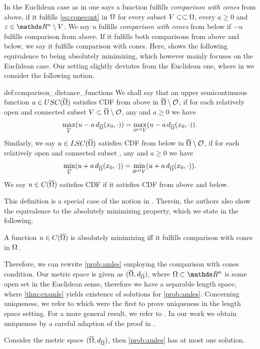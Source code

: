 %
%
In the Euclidean case as in \cite{aronsson2004tour} one says a function fulfills \emph{comparison with cones} from above, if it fulfills \cref{eq:conecont} in $\Omega$ for every subset $V\subset\subset\Omega$, every $a\geq 0$ and $z\in\R^n\setminus V$. We say $u$ fulfills \emph{comparison with cones} from below if $-u$ fulfills comparison from above. If it fulfills both comparisons from above and below, we say it fulfills comparison with cones. Here, \cite[Prop. 2.1]{aronsson2004tour} shows the following equivalence to being absolutely minimizing, which however mainly focuses on the Euclidean case. Our setting slightly deviates from the Euclidean one, where in \cite{bungert2021uniform} we consider the following notion.
%
\begin{definition}{\cite[Def. 4.1]{bungert2021uniform}}{def:comparison_distance_functions}
We shall say that an upper semicontinuous function $u\in USC(\overline{\Omega})$ satisfies CDF from above in $\overline{\Omega}\setminus\mathcal{O}$, if  for each relatively open and connected subset $V \subset \overline{\Omega}\setminus\mathcal{O}$, any  and $a\geq 0$ we have
\[\max_{\overline{V}}(u - a\,d_{\overline{\Omega}}(x_0,\cdot)) = \max_{\partial^\text{rel} V}(u - a\,d_{\overline{\Omega}}(x_0,\cdot)).\]
Similarly, we say  $u\in LSC(\overline{\Omega})$ satisfies CDF from below in $\overline{\Omega}\setminus\mathcal{O}$, if for each relatively open and connected subset , any  and $a\geq 0$ we have
\[\min_{\overline{V}}(u + a\,d_{\overline{\Omega}}(x_0,\cdot)) = \min_{\partial^\text{rel} V}(u + a\,d_{\overline{\Omega}}(x_0,\cdot)).\]
We say $u\in C(\overline{\Omega})$ satisfies CDF if it satisfies CDF from above and below.
\end{definition}
%
\noindent%
This definition is a special case of the notion in \cite{juutinen2006equivalence}. Therein, the authors also show the equivalence to the absolutely minimizing property, which we state in the following.
%
%
\begin{theorem}{\cite[Prop. 4.1]{juutinen2006equivalence}}{}
A function $u\in C(\overline{\Omega})$ is absolutely minimizing iff it fulfills comparison with cones in $\Omega$.
\end{theorem}
%
\noindent%
Therefore, we can rewrite \cref{prob:amles} employing the comparison with cones condition. Our metric space is given as $(\overline{\Omega}, d_{\overline{\Omega}})$, where $\domain\subset\R^n$ is some open set in the Euclidean sense, therefore we have a separable length space, where \cref{thm:examle} yields existence of solutions for \cref{prob:amles}. Concerning uniqueness, we refer to \cite{peres2009tug} which were the first to prove uniqueness in the length space setting. For a more general result, we refer to \cite{naor2012absolutely}. In our work we obtain uniqueness by a careful adaption of the proof in \cite{armstrong2010easy}.
%
\begin{proposition}{\cite[Prop. 4.11]{bungert2021uniform}}{}
Consider the metric space $(\overline{\Omega}, d_{\overline{\Omega}})$, then \cref{prob:amles} has at most one solution.
\end{proposition}
%
%
